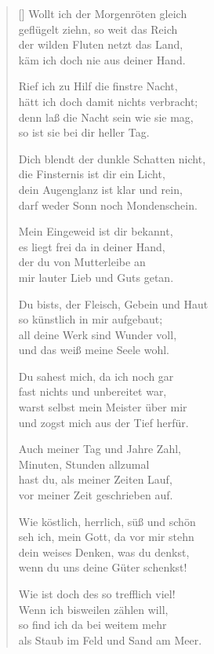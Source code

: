 \begin{multicols}{2}
\begin{verse}[\versewidth]
 Wollt ich der Morgenröten gleich\\
geflügelt ziehn, so weit das Reich\\
der wilden Fluten netzt das Land,\\
käm ich doch nie aus deiner Hand.

 Rief ich zu Hilf die finstre Nacht,\\
hätt ich doch damit nichts verbracht;\\
denn laß die Nacht sein wie sie mag,\\
so ist sie bei dir heller Tag.

 Dich blendt der dunkle Schatten nicht,\\
die Finsternis ist dir ein Licht,\\
dein Augenglanz ist klar und rein,\\
darf weder Sonn noch Mondenschein.

 Mein Eingeweid ist dir bekannt,\\
es liegt frei da in deiner Hand,\\
der du von Mutterleibe an\\
mir lauter Lieb und Guts getan.

 Du bists, der Fleisch, Gebein und Haut\\
so künstlich in mir aufgebaut;\\
all deine Werk sind Wunder voll,\\
und das weiß meine Seele wohl.

 Du sahest mich, da ich noch gar\\
fast nichts und unbereitet war,\\
warst selbst mein Meister über mir\\
und zogst mich aus der Tief herfür.

 Auch meiner Tag und Jahre Zahl,\\
Minuten, Stunden allzumal\\
hast du, als meiner Zeiten Lauf,\\
vor meiner Zeit geschrieben auf.

 Wie köstlich, herrlich, süß und schön\\
seh ich, mein Gott, da vor mir stehn\\
dein weises Denken, was du denkst,\\
wenn du uns deine Güter schenkst!

 Wie ist doch des so trefflich viel!\\
Wenn ich bisweilen zählen will,\\
so find ich da bei weitem mehr\\
als Staub im Feld und Sand am Meer.


\end{verse}
\end{multicols}
